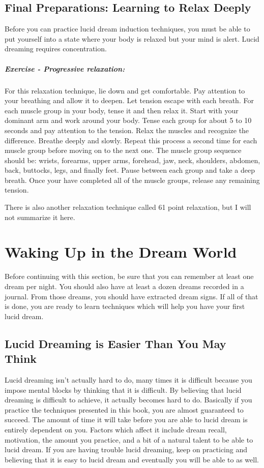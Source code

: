 \documentclass{book}
\begin{document}
\section{Final Preparations: Learning to Relax Deeply}
Before you can practice lucid dream induction techniques, you must be able to put yourself into a state where your body is relaxed but your mind is alert. Lucid dreaming requires concentration.

\paragraph{Exercise - Progressive relaxation:} For this relaxation technique, lie down and get comfortable. Pay attention to your breathing and allow it to deepen. Let tension escape with each breath. For each muscle group in your body, tense it and then relax it. Start with your dominant arm and work around your body. Tense each group for about 5 to 10 seconds and pay attention to the tension. Relax the muscles and recognize the difference. Breathe deeply and slowly. Repeat this process a second time for each muscle group before moving on to the next one. The muscle group sequence should be: wrists, forearms, upper arms, forehead, jaw, neck, shoulders, abdomen, back, buttocks, legs, and finally feet. Pause between each group and take a deep breath. Once your have completed all of the muscle groups, release any remaining tension.

\bigskip\noindent There is also another relaxation technique called 61 point relaxation, but I will not summarize it here.



\chapter{Waking Up in the Dream World}
Before continuing with this section, be sure that you can remember at least one dream per night. You should also have at least a dozen dreams recorded in a journal. From those dreams, you should have extracted dream signs. If all of that is done, you are ready to learn techniques which will help you have your first lucid dream.

\section{Lucid Dreaming is Easier Than You May Think}
Lucid dreaming isn't actually hard to do, many times it is difficult because you impose mental blocks by thinking that it is difficult. By believing that lucid dreaming is difficult to achieve, it actually becomes hard to do. Basically if you practice the techniques presented in this book, you are almost guaranteed to succeed. The amount of time it will take before you are able to lucid dream is entirely dependent on you. Factors which affect it include dream recall, motivation, the amount you practice, and a bit of a natural talent to be able to lucid dream. If you are having trouble lucid dreaming, keep on practicing and believing that it is easy to lucid dream and eventually you will be able to as well.
\end{document}

